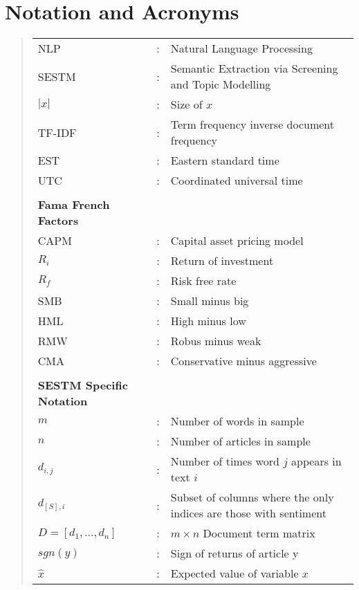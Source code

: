 \documentclass[ oneside,%
                    author={Joshua Felmeden},
                    degree={MEng},
                     title={Sentiment Analysis of Financial Headlines Based on Stock Returns},
                  subtitle={Research}]{dissertation}
\begin{document}

\chapter*{Notation and Acronyms}

\begin{quote}
\noindent
\begin{tabular}{lcl}
NLP               &:    &     Natural Language Processing \\
SESTM             &:    &     Semantic Extraction via Screening and Topic Modelling \\
$|x|$             &:    &     Size of $x$ \\
TF-IDF            &:    &     Term frequency inverse document frequency\\
EST               &:    &     Eastern standard time\\
UTC               &:    &     Coordinated universal time\\
\\
\textbf{Fama French Factors} \\
CAPM              &:    &     Capital asset pricing model\\
$R_i$             &:    &     Return of investment\\
$R_f$             &:    &     Risk free rate\\
SMB               &:    &     Small minus big\\
HML               &:    &     High minus low\\    
RMW               &:    &     Robus minus weak\\
CMA               &:    &     Conservative minus aggressive\\
\\
\textbf{SESTM Specific Notation} \\
$m$               &:    &     Number of words in sample \\
$n$               &:    &     Number of articles in sample \\
$d_{i,j}$         &:    &     Number of times word $j$ appears in text $i$ \\
$d_{[S],i}$       &:    &     Subset of columns where the only indices are those with sentiment \\
$D = [d_1, \dots, d_n]$ &:    & $m \times n$ Document term matrix \\
$sgn(y)$          &:    &     Sign of returns of article y \\
$\hat x$          &:    &    Expected value of variable $x$ \\
\end{tabular}
\end{quote}
\end{document}

